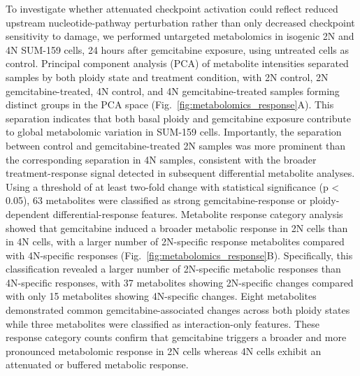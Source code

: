 \documentclass[11pt,notitlepage]{article}
\begin{document}
To investigate whether attenuated checkpoint activation could reflect reduced upstream nucleotide-pathway perturbation rather than only decreased checkpoint sensitivity to damage, we performed untargeted metabolomics in isogenic 2N and 4N SUM-159 cells, 24 hours after gemcitabine exposure, using untreated cells as control. Principal component analysis (PCA) of metabolite intensities separated samples by both ploidy state and treatment condition, with 2N control, 2N gemcitabine-treated, 4N control, and 4N gemcitabine-treated samples forming distinct groups in the PCA space (Fig.~\ref{fig:metabolomics_response}A). This separation indicates that both basal ploidy and gemcitabine exposure contribute to global metabolomic variation in SUM-159 cells. Importantly, the separation between control and gemcitabine-treated 2N samples was more prominent than the corresponding separation in 4N samples, consistent with the broader treatment-response signal detected in subsequent differential metabolite analyses.
Using a threshold of at least two-fold change with statistical significance (p < 0.05), 63 metabolites were classified as strong gemcitabine-response or ploidy-dependent differential-response features. Metabolite response category analysis showed that gemcitabine induced a broader metabolic response in 2N cells than in 4N cells, with a larger number of 2N-specific response metabolites compared with 4N-specific responses (Fig.~\ref{fig:metabolomics_response}B). Specifically, this classification revealed a larger number of 2N-specific metabolic responses than 4N-specific responses, with 37 metabolites showing 2N-specific changes compared with only 15 metabolites showing 4N-specific changes. Eight metabolites demonstrated common gemcitabine-associated changes across both ploidy states while three metabolites were classified as interaction-only features. These response category counts confirm that gemcitabine triggers a broader and more pronounced metabolomic response in 2N cells whereas 4N cells exhibit an attenuated or buffered metabolic response. 
\end{document}

